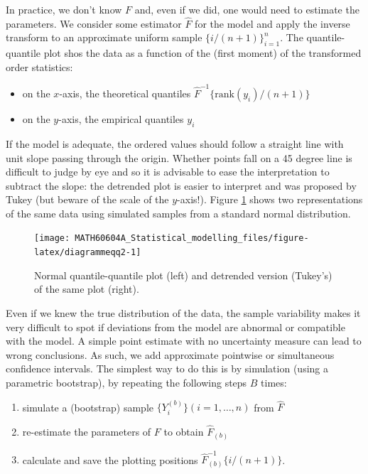 \documentclass[
  11pt,
  letterpaper,
]{book}
\providecommand{\tightlist}{%
  \setlength{\itemsep}{0pt}\setlength{\parskip}{0pt}}
\theoremstyle{definition}
\theoremstyle{definition}
\theoremstyle{definition}
\theoremstyle{remark}
\begin{document}
In practice, we don't know \(F\) and, even if we did, one would need to estimate the parameters. We consider some estimator \(\widehat{F}\) for the model and apply the inverse transform to an approximate uniform sample \(\{i/(n+1)\}_{i=1}^n\). The quantile-quantile plot shos the data as a function of the (first moment) of the transformed order statistics:

\begin{itemize}
\tightlist
\item
  on the \(x\)-axis, the theoretical quantiles \(\widehat{F}^{-1}\{\mathrm{rank}(y_i)/(n+1)\}\)
\item
  on the \(y\)-axis, the empirical quantiles \(y_i\)
\end{itemize}

If the model is adequate, the ordered values should follow a straight line with unit slope passing through the origin. Whether points fall on a 45 degree line is difficult to judge by eye and so it is advisable to ease the interpretation to subtract the slope: the detrended plot is easier to interpret and was proposed by Tukey (but beware of the scale of the \(y\)-axis!). Figure \ref{fig:diagrammeqq2} shows two representations of the same data using simulated samples from a standard normal distribution.

\begin{figure}

{\centering \texttt{[image: MATH60604A\_Statistical\_modelling\_files/figure-latex/diagrammeqq2-1]} 

}

\caption{Normal quantile-quantile plot (left) and detrended version (Tukey's) of the same plot (right).}\label{fig:diagrammeqq2}
\end{figure}

Even if we knew the true distribution of the data, the sample variability makes it very difficult to spot if deviations from the model are abnormal or compatible with the model. A simple point estimate with no uncertainty measure can lead to wrong conclusions. As such, we add approximate pointwise or simultaneous confidence intervals. The simplest way to do this is by simulation (using a parametric bootstrap), by repeating the following steps \(B\) times:

\begin{enumerate}
\def\labelenumi{\arabic{enumi}.}
\tightlist
\item
  simulate a (bootstrap) sample \(\{Y^{(b)}_{i}\} (i=1,\ldots, n)\) from \(\widehat{F}\)
\item
  re-estimate the parameters of \(F\) to obtain \(\widehat{F}_{(b)}\)
\item
  calculate and save the plotting positions \(\widehat{F}^{-1}_{(b)}\{i/(n+1)\}\).
\end{enumerate}
\end{document}
